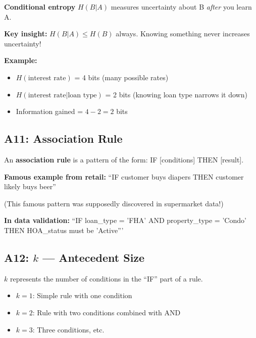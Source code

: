 \documentclass[11pt,a4paper]{article}
\begin{document}
\textbf{Conditional entropy} $H(B|A)$ measures uncertainty about B \textit{after} you learn A.

\textbf{Key insight:} $H(B|A) \leq H(B)$ always. Knowing something never increases uncertainty!

\textbf{Example:}
\begin{itemize}
    \item $H(\text{interest rate})$ = 4 bits (many possible rates)
    \item $H(\text{interest rate} | \text{loan type})$ = 2 bits (knowing loan type narrows it down)
    \item Information gained = $4 - 2 = 2$ bits
\end{itemize}

\subsection*{A11: Association Rule}
\label{A11}

An \textbf{association rule} is a pattern of the form: IF [conditions] THEN [result].

\textbf{Famous example from retail:}
``IF customer buys diapers THEN customer likely buys beer''

(This famous pattern was supposedly discovered in supermarket data!)

\textbf{In data validation:}
``IF loan\_type = 'FHA' AND property\_type = 'Condo' THEN HOA\_status must be 'Active'''

\subsection*{A12: $k$ --- Antecedent Size}
\label{A12}

$k$ represents the number of conditions in the ``IF'' part of a rule.

\begin{itemize}
    \item $k=1$: Simple rule with one condition
    \item $k=2$: Rule with two conditions combined with AND
    \item $k=3$: Three conditions, etc.
\end{itemize}
\end{document}
